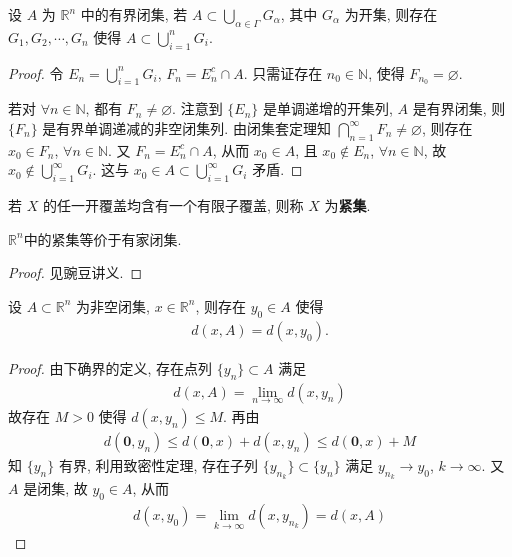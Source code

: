 \documentclass[../../main.tex]{subfiles}
\begin{document}
\begin{theorem}[有限覆盖定理]\label{theorem:有限覆盖定理}
设 $A$ 为 $\mathbb{R}^n$ 中的有界闭集, 若 $A \subset \bigcup_{\alpha \in \varGamma} G_\alpha$, 其中 $G_\alpha$ 为开集, 则存在 $G_1, G_2, \cdots, G_n$ 使得 $A \subset \bigcup_{i = 1}^{n} G_i$.
\end{theorem}
\begin{proof}
令 $E_n = \bigcup_{i = 1}^{n} G_i$, $F_n = E_n^c \cap A$. 只需证存在 $n_0 \in \mathbb{N}$, 使得 $F_{n_0} = \varnothing$.

若对 $\forall n \in \mathbb{N}$, 都有 $F_n \neq \varnothing$. 注意到 $\{E_n\}$ 是单调递增的开集列, $A$ 是有界闭集, 则 $\{F_n\}$ 是有界单调递减的非空闭集列. 由闭集套定理知 $\bigcap_{n = 1}^{\infty} F_n \neq \varnothing$, 则存在 $x_0 \in F_n$, $\forall n \in \mathbb{N}$. 又 $F_n = E_n^c \cap A$, 从而 $x_0 \in A$, 且 $x_0 \notin E_n$, $\forall n \in \mathbb{N}$, 故 $x_0 \notin \bigcup_{i = 1}^{\infty} G_i$. 这与 $x_0 \in A \subset \bigcup_{i = 1}^{\infty} G_i$ 矛盾.

\end{proof}

\begin{definition}[紧集]
若 $X$ 的任一开覆盖均含有一个有限子覆盖, 则称 $X$ 为\textbf{紧集}.
\end{definition}

\begin{theorem}\label{theorem:mathbb{R}^n中的紧集等价于有家闭集.}
$\mathbb{R}^n$中的紧集等价于有家闭集.
\end{theorem}
\begin{proof}
见豌豆讲义.

\end{proof}

\begin{theorem}
设 $A \subset \mathbb{R}^n$ 为非空闭集, $x \in \mathbb{R}^n$, 则存在 $y_0 \in A$ 使得
\begin{align*}
d(x, A) = d(x, y_0).
\end{align*}
\end{theorem}
\begin{proof}
由下确界的定义, 存在点列 $\{y_n\} \subset A$ 满足
\begin{align*}
d(x, A) = \lim_{n \to \infty} d(x, y_n)
\end{align*}
故存在 $M > 0$ 使得 $d(x, y_n) \leqslant M$. 再由
\begin{align*}
d(\mathbf{0}, y_n) \leqslant d(\mathbf{0}, x) + d(x, y_n) \leqslant d(\mathbf{0}, x) + M
\end{align*}
知 $\{y_n\}$ 有界, 利用致密性定理, 存在子列 $\{y_{n_k}\} \subset \{y_n\}$ 满足 $y_{n_k} \to y_0$, $k \to \infty$. 又 $A$ 是闭集, 故 $y_0 \in A$, 从而
\begin{align*}
d(x, y_0) = \lim_{k \to \infty} d(x, y_{n_k}) = d(x, A)
\end{align*}

\end{proof}
\end{document}
